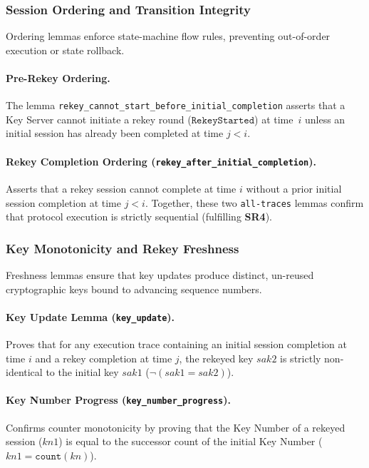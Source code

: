 \subsubsection{Session Ordering and Transition Integrity}
Ordering lemmas enforce state-machine flow rules, preventing out-of-order execution or state rollback.

\begin{sloppypar}
\paragraph{Pre-Rekey Ordering.}
The lemma \texttt{rekey\_\allowbreak{}cannot\_\allowbreak{}start\_\allowbreak{}before\_\allowbreak{}initial\_\allowbreak{}completion} asserts that a Key Server cannot initiate a rekey round ($\mathtt{RekeyStarted}$) at time~$i$ unless an initial session has already been completed at time $j < i$.
\end{sloppypar}

\paragraph{Rekey Completion Ordering (\texttt{rekey\_after\_initial\_completion}).} Asserts that a rekey session cannot complete at time $i$ without a prior initial session completion at time $j < i$. Together, these two \texttt{all-traces} lemmas confirm that protocol execution is strictly sequential (fulfilling \textbf{SR4}).

\subsubsection{Key Monotonicity and Rekey Freshness}
Freshness lemmas ensure that key updates produce distinct, un-reused cryptographic keys bound to advancing sequence numbers.

\paragraph{Key Update Lemma (\texttt{key\_update}).} Proves that for any execution trace containing an initial session completion at time $i$ and a rekey completion at time $j$, the rekeyed key $\mathit{sak2}$ is strictly non-identical to the initial key $\mathit{sak1}$ ($\neg(\mathit{sak1} = \mathit{sak2})$).

\paragraph{Key Number Progress (\texttt{key\_number\_progress}).} Confirms counter monotonicity by proving that the Key Number of a rekeyed session ($\mathit{kn1}$) is equal to the successor count of the initial Key Number ($\mathit{kn1} = \mathtt{count}(\mathit{kn})$).

